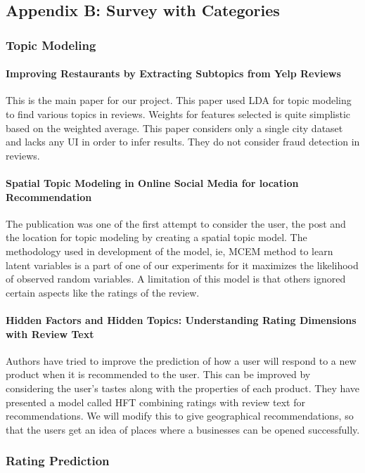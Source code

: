 \documentclass[12pt]{article} %
\begin{document}
\subsection{Appendix B: Survey with Categories}

\subsubsection{Topic Modeling}

\paragraph{Improving Restaurants by Extracting Subtopics from Yelp Reviews}
This is the main paper for our project. This paper used LDA for topic modeling to find various topics in reviews. Weights for features selected is quite simplistic based on the weighted average. This paper considers only a single city dataset and lacks any UI in order to infer results. They do not consider fraud detection in reviews.

\paragraph{Spatial Topic Modeling in Online Social Media for location Recommendation}
The publication was one of the first attempt to consider the user, the post and the location for topic modeling by creating a spatial topic model. The methodology used in development of the model, ie, MCEM method to learn latent variables is a part of one of our experiments for it maximizes the likelihood of observed random variables. A limitation of this model is that others ignored certain aspects like the ratings of the review.

\paragraph{Hidden Factors and Hidden Topics: Understanding Rating Dimensions with Review Text} 
Authors have tried to improve the prediction of how a user will respond to a new product when it is recommended to the user. This can be improved by considering the user's tastes along with the properties of each product. They have presented a model called HFT combining ratings with review text for recommendations. We will modify this to give geographical recommendations, so that the users get an idea of places where a businesses can be opened successfully. 

\subsubsection{Rating Prediction}
\end{document}
